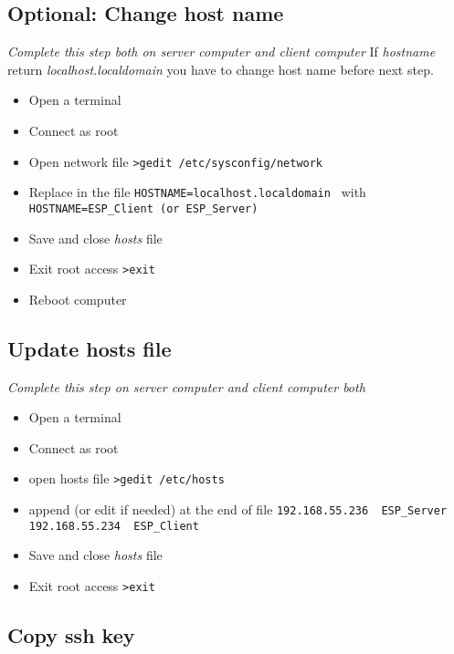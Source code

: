 \subsection{Optional: Change host name}
\emph{Complete this step both on server computer and client computer}
If \emph{hostname} return \emph{localhost.localdomain} you have to change host name before next step.
\begin{itemize}
\item Open a terminal
\item Connect as root
\item Open network file
	\newline
	\verb|>gedit /etc/sysconfig/network |
\item Replace in the file
	\newline
	\verb|HOSTNAME=localhost.localdomain |
	\newline
	with
	\newline
	\verb|HOSTNAME=ESP_Client (or ESP_Server) |	
\item Save and close \emph{hosts} file
\item Exit root access
	\newline
	\verb|>exit |
\item Reboot computer
\end{itemize}

\subsection{Update hosts file}
\emph{Complete this step on server computer and client computer both}
\begin{itemize}
\item Open a terminal
\item Connect as root
\item open hosts file
	\newline
	\verb|>gedit /etc/hosts |
\item append (or edit if needed) at the end of file
	\newline
	\verb|192.168.55.236  ESP_Server|
	\newline
	\verb|192.168.55.234  ESP_Client|
\item Save and close \emph{hosts} file
\item Exit root access
	\newline
	\verb|>exit |
\end{itemize}

\label{ssh-key}
\subsection{Copy ssh key}


